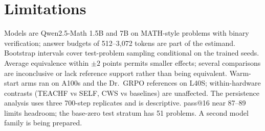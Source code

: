 \documentclass{article}
\theoremstyle{plain}
\begin{document}
\section{Limitations}\label{sec:limits}
Models are Qwen2.5-Math 1.5B and 7B on MATH-style problems with binary verification; answer budgets of 512--3,072
tokens are part of the estimand. Bootstrap intervals cover test-problem sampling conditional on the trained seeds.
Average equivalence within $\pm2$ points permits smaller effects; several comparisons are inconclusive or lack
reference support rather than being equivalent. Warm-start arms ran on A100s and the Dr.\ GRPO references on L40S;
within-hardware contrasts (TEACHF vs SELF, CWS vs baselines) are unaffected. The persistence analysis uses three
700-step replicates and is descriptive. pass@16 near 87--89 limits headroom; the base-zero test stratum has 51
problems. A second model family is being prepared.




\newpage
\appendix
\onecolumn
\end{document}
